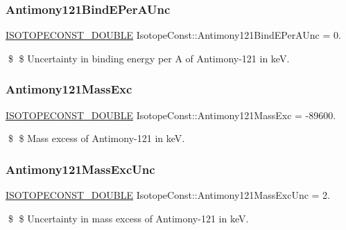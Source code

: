 \subsubsection{\texorpdfstring{Antimony121\+Bind\+E\+Per\+A\+Unc}{Antimony121BindEPerAUnc}}
{\footnotesize\ttfamily \mbox{\hyperlink{group___isotope_const-_macros_ga8f45a7272ce02c0b4c65c44636ed719a}{I\+S\+O\+T\+O\+P\+E\+C\+O\+N\+S\+T\+\_\+\+D\+O\+U\+B\+LE}} Isotope\+Const\+::\+Antimony121\+Bind\+E\+Per\+A\+Unc = 0.}

\$ \$ Uncertainty in binding energy per A of Antimony-\/121 in keV. \mbox{\label{group___isotope_const-_antimony-_sb121_ga87b0998302919b6d4a870717c5547041}} 
\subsubsection{\texorpdfstring{Antimony121\+Mass\+Exc}{Antimony121MassExc}}
{\footnotesize\ttfamily \mbox{\hyperlink{group___isotope_const-_macros_ga8f45a7272ce02c0b4c65c44636ed719a}{I\+S\+O\+T\+O\+P\+E\+C\+O\+N\+S\+T\+\_\+\+D\+O\+U\+B\+LE}} Isotope\+Const\+::\+Antimony121\+Mass\+Exc = -\/89600.}

\$ \$ Mass excess of Antimony-\/121 in keV. \mbox{\label{group___isotope_const-_antimony-_sb121_gaf1795f83b1e82875b787234f364210f0}} 
\subsubsection{\texorpdfstring{Antimony121\+Mass\+Exc\+Unc}{Antimony121MassExcUnc}}
{\footnotesize\ttfamily \mbox{\hyperlink{group___isotope_const-_macros_ga8f45a7272ce02c0b4c65c44636ed719a}{I\+S\+O\+T\+O\+P\+E\+C\+O\+N\+S\+T\+\_\+\+D\+O\+U\+B\+LE}} Isotope\+Const\+::\+Antimony121\+Mass\+Exc\+Unc = 2.}

\$ \$ Uncertainty in mass excess of Antimony-\/121 in keV. \mbox{\label{group___isotope_const-_antimony-_sb121_gaa7f5b5b51df8fa4217a93a20c076e8c7}} 
